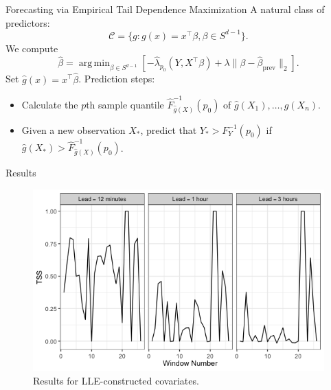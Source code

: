 \documentclass{beamer}
\DeclareMathOperator*{\argmin}{arg\,min}
\begin{document}
\begin{frame}{Forecasting via Empirical Tail Dependence Maximization}
    A natural class of predictors:
    \[
    \mathcal{C} = \{g : g(x) = x^{\top}\beta, \beta \in S^{d - 1}\}.
    \]
    We compute
    \[
    \hat{\beta} = \argmin_{\beta \in S^{d - 1}} \left[-\hat{\lambda}_{p_0}(Y, X^{\top}\beta) + \lambda\|\beta - \hat{\beta}_{\text{prev}}\|_2\right].
    \]
    Set $\hat{g}(x) = x^{\top}\hat{\beta}$. Prediction steps:
    \begin{itemize}
        \item Calculate the $p$th sample quantile $\hat{F}_{\hat{g}(X)}^{-1}(p_0)$ of $\hat{g}(X_1), \ldots, \hat{g}(X_n)$.
        \item Given a new observation $X_*$, predict that $Y_* > F_{Y}^{-1}(p_0)$ if $\hat{g}(X_*) > \hat{F}_{\hat{g}(X)}^{-1}(p_0)$.
    \end{itemize}
\end{frame}

\begin{frame}{Results}
    \begin{figure}[!htb]
        \centering
        \includegraphics[scale=0.5]{0601_results.png}
        \caption{Results for LLE-constructed covariates.}
        \label{fig:0601_results}
    \end{figure}
\end{frame}
\end{document}

